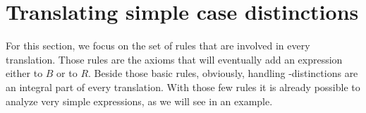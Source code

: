 

\section{Translating simple case distinctions}

For this section, we focus on the set of rules that are involved in every translation. Those rules are the axioms that will eventually add an expression either to $B$ or to $R$. Beside those basic rules, obviously, handling \CASE-distinctions are an integral part of every translation. With those few rules it is already possible to analyze very simple expressions, as we will see in an example.

